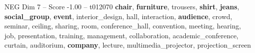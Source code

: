 \begin{textsample}{NEG Dim 7 – Score -1.00 – t012070}  \label{ex:f7_neg_039}
\textbf{chair}, \textbf{furniture}, trousers, \textbf{shirt}, \textbf{jeans}, \textbf{social\_group}, \textbf{event}, interior\_design, hall, interaction, \textbf{audience}, crowd, seminar, ceiling, sharing, room, conference\_hall, convention, meeting, hearing, job, presentation, training, management, collaboration, academic\_conference, curtain, auditorium, \textbf{company}, lecture, multimedia\_projector, projection\_screen

\end{textsample}
